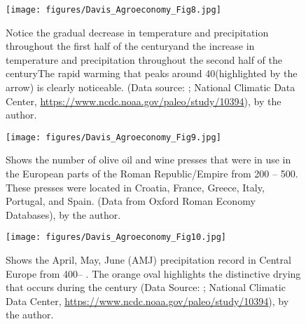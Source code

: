 	
	\begin{figure}[!p]
		\texttt{[image: figures/Davis\_Agroeconomy\_Fig8.jpg]}
		\centering
		\caption{Notice the gradual decrease in temperature and precipitation throughout the first half of the  century\BC and the increase in temperature and precipitation throughout the second half of the  century\BC The rapid warming that peaks around 40\AD  (highlighted by the arrow) is clearly noticeable. (Data source: \textcite{Büntgen_2011b}; National Climatic Data Center, \url{https://www.ncdc.noaa.gov/paleo/study/10394}), by the author.}
		\label{fig:DavisFig8}
	\end{figure}
	
	
	
	\begin{figure}[!p]
		\texttt{[image: figures/Davis\_Agroeconomy\_Fig9.jpg]}
		\centering
		\caption{Shows the number of olive oil and wine presses that were in use in the European parts of the Roman Republic/Empire from 200 \BC –  500\AD. These presses were located in Croatia, France, Greece, Italy, Portugal, and Spain. (Data from Oxford Roman Economy Databases), by the author.}
		\label{fig:DavisFig9}
	\end{figure}
	
	
	
	\begin{figure}[!p]
		\texttt{[image: figures/Davis\_Agroeconomy\_Fig10.jpg]}
		\centering
		\caption{Shows the April, May, June (AMJ) precipitation record in Central Europe from 400\BC – . The orange oval highlights the distinctive drying that occurs during the  century \AD (Data Source: \textcite{Büntgen_2011b}; National Climatic Data Center, \url{https://www.ncdc.noaa.gov/paleo/study/10394}), by the author.}
		\label{fig:DavisFig10}
	\end{figure}
	
	
	
